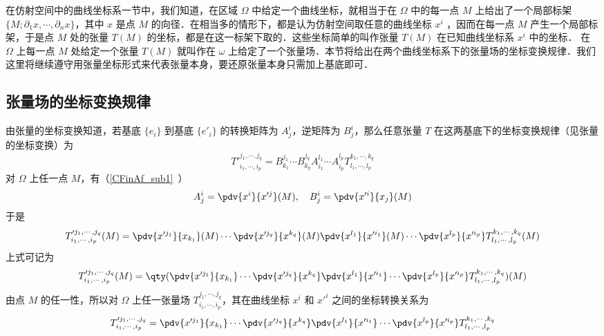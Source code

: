 
在仿射空间中的曲线坐标系一节中，我们知道，在区域 $\Omega$ 中给定一个曲线坐标，就相当于在 $\Omega$ 中的每一点 $M$ 上给出了一个局部标架 $\{M;\partial_1 x,\cdots,\partial_n x\}$，其中 $x$ 是点 $M$ 的向径．在相当多的情形下，都是认为仿射空间取任意的曲线坐标 $x^i$ ，因而在每一点 $M$ 产生一个局部标架，于是点 $M$ 处的张量 $T(M)$ 的坐标，都是在这一标架下取的．这些坐标简单的叫作张量 $T(M)$ 在已知曲线坐标系 $x^i$ 中的坐标． 在 $\Omega$ 上每一点 $M$ 处给定一个张量 $T(M)$ 就叫作在 $\omega$ 上给定了一个张量场．本节将给出在两个曲线坐标系下的张量场的坐标变换规律．我们这里将继续遵守用张量坐标形式来代表张量本身，要还原张量本身只需加上基底即可．

\subsection{张量场的坐标变换规律}
由张量的坐标变换知道，若基底 $\{e_i\}$ 到基底 $\{e'_i\}$ 的转换矩阵为 $A^i_j$，逆矩阵为 $B^i_j$，那么任意张量 $T$ 在这两基底下的坐标变换规律（见张量的坐标变换）为
\begin{equation}
T'^{j_1,\cdots,j_q}_{i_1,\cdots,i_p}=B^{j_1}_{k_1}\cdots B^{j_q}_{k_q}A^{l_1}_{i_1}\cdots A^{l_p}_{i_p}T^{k_1,\cdots,k_q}_{l_1,\cdots,l_p}
\end{equation}
对 $\Omega$ 上任一点 $M$，有（\autoref{CFinAf_sub1}~）
\begin{equation}
A^i_j=\pdv{x^i}{x'^j}(M),\quad B^i_j=\pdv{x'^i}{x_j}(M)
\end{equation}
于是
\begin{equation}
T'^{j_1,\cdots,j_q}_{i_1,\cdots,i_p}(M)=\pdv{x'^{j_1}}{x_{k_1}}(M)\cdots \pdv{x'^{j_q}}{x^{k_q}}(M)\pdv{x^{l_1}}{x'^{i_1}}(M)\cdots \pdv{x^{l_p}}{x'^{i_p}}T^{k_1,\cdots,k_q}_{l_1,\cdots,l_p}(M)
\end{equation}
上式可记为
\begin{equation}
T'^{j_1,\cdots,j_q}_{i_1,\cdots,i_p}(M)=\qty(\pdv{x'^{j_1}}{x_{k_1}}\cdots \pdv{x'^{j_q}}{x^{k_q}}\pdv{x^{l_1}}{x'^{i_1}}\cdots \pdv{x^{l_p}}{x'^{i_p}}T^{k_1,\cdots,k_q}_{l_1,\cdots,l_p})(M)
\end{equation}
由点 $M$ 的任一性，所以对 $\Omega$ 上任一张量场 $T^{j_1,\cdots,j_q}_{i_1,\cdots,i_p}$，其在曲线坐标 $x^i$ 和 $x'^i$ 之间的坐标转换关系为
\begin{equation}
T'^{j_1,\cdots,j_q}_{i_1,\cdots,i_p}=\pdv{x'^{j_1}}{x_{k_1}}\cdots \pdv{x'^{j_q}}{x^{k_q}}\pdv{x^{l_1}}{x'^{i_1}}\cdots \pdv{x^{l_p}}{x'^{i_p}}T^{k_1,\cdots,k_q}_{l_1,\cdots,l_p}
\end{equation}



